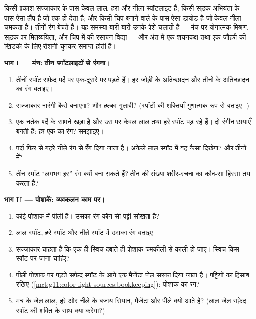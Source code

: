 \begin{problem}
\label{pb:g11:color-light-sources:1}
किसी प्रकाश-सज्जाकार के पास केवल लाल, हरा और नीला स्पॉटलाइट हैं; किसी
सड़क-अभियंता के पास ऐसा लैंप है जो एक ही  देता है; और
किसी चिप बनाने वाले के पास ऐसा डायोड है जो केवल नीला चमकता है। तीनों रंग
बेचते हैं। यह समस्या बारी-बारी उनके पेशे चलाती है --- मंच पर योगात्मक
मिश्रण, सड़क पर  मितव्ययिता, और चिप में 
की रसायन-विद्या --- और अंत में एक शयनकक्ष तथा एक जौहरी की खिड़की के लिए
रोशनी चुनकर समाप्त होती है।

\medskip
\noindent\textbf{भाग I --- मंच: तीन स्पॉटलाइटों से रंगना।}
\begin{enumerate}
  \item तीनों स्पॉट सफ़ेद पर्दे पर एक-दूसरे पर पड़ते हैं। हर जोड़ी के
        अतिच्छादन और तीनों के अतिच्छादन का रंग बताइए।
  \item सज्जाकार नारंगी कैसे बनाएगा? और हल्का गुलाबी? (स्पॉटों की
        शक्तियाँ गुणात्मक रूप से बताइए।)
  \item एक नर्तक पर्दे के सामने खड़ा है और उस पर केवल लाल तथा हरे स्पॉट
        पड़ रहे हैं। दो रंगीन छायाएँ बनती हैं: हर एक का रंग? समझाइए।
  \item पर्दा फिर से गहरे नीले रंग से रँग दिया जाता है। अकेले लाल स्पॉट
        में वह कैसा दिखेगा? और तीनों में?
  \item तीन स्पॉट ``लगभग हर'' रंग क्यों बना सकते हैं? तीन की संख्या
        शरीर-रचना का कौन-सा हिस्सा तय करता है?
\end{enumerate}

\medskip
\noindent\textbf{भाग II --- पोशाकें: व्यवकलन काम पर।}
\begin{enumerate}[resume]
  \item कोई पोशाक  में पीली है। उसका रंग कौन-सी
        पट्टी सोखता है?
  \item लाल स्पॉट, हरे स्पॉट और नीले स्पॉट में उसका रंग बताइए।
  \item सज्जाकार चाहता है कि एक ही स्विच दबाते ही पोशाक चमकीली से काली
        हो जाए। स्विच किस स्पॉट पर जाना चाहिए?
  \item पीली पोशाक पर पड़ते सफ़ेद स्पॉट के आगे एक मैजेंटा जेल सरका दिया
        जाता है। पट्टियों का हिसाब रखिए (\cref{met:g11:color-light-sources:bookkeeping}): पोशाक का रंग?
  \item मंच के जेल लाल, हरे और नीले के बजाय सियान, मैजेंटा और पीले
        क्यों आते हैं? (लाल जेल सफ़ेद स्पॉट की शक्ति के साथ क्या
        करेगा?)
\end{enumerate}


\end{problem}
